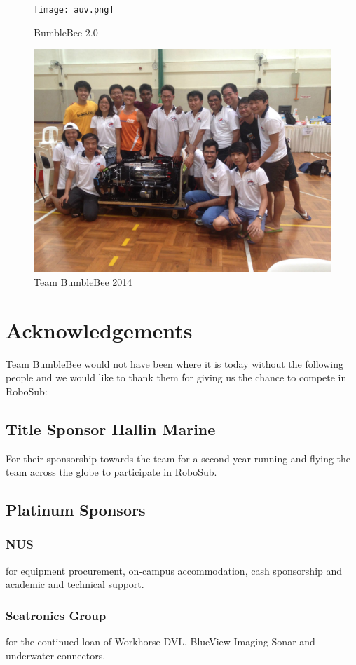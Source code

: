 \documentclass[journal,12pt]{IEEEtran}
\begin{document}
\begin{figure}[h]
\centering
\texttt{[image: auv.png]}
\caption{BumbleBee 2.0}
\captionsetup{justification=centering}
\end{figure}

\begin{figure}[h]
\centering
\includegraphics[width=3.5 in]{team.png}
\caption{Team BumbleBee 2014}
\captionsetup{justification=centering}
\end{figure}


\section*{Acknowledgements}
Team BumbleBee would not have been where it is today without the following people and we would like to thank them for giving us the chance to compete in RoboSub:

\subsection*{Title Sponsor Hallin Marine}
For their sponsorship towards the team for a second year running and flying the team across the globe to participate in RoboSub.

\subsection*{Platinum Sponsors}
\subsubsection*{NUS} for equipment procurement, on-campus accommodation, cash sponsorship and academic and technical support.

\subsubsection*{Seatronics Group} for the continued loan of Workhorse DVL, BlueView Imaging Sonar and underwater connectors.
\end{document}

